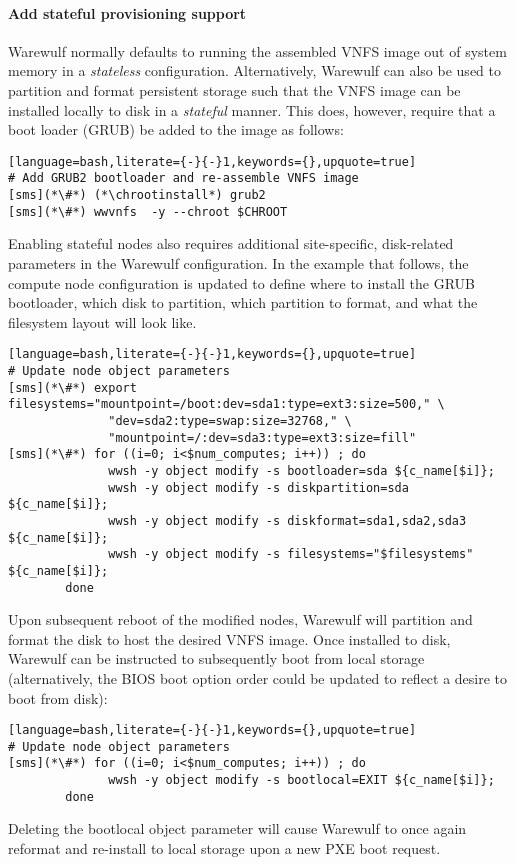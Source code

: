 \paragraph{Add stateful provisioning support}

Warewulf normally defaults to running the assembled VNFS image out of system
memory in a {\em stateless} configuration. Alternatively, Warewulf can also be
used to partition and format persistent storage such that the VNFS image can be
installed locally to disk in a {\em stateful} manner.  This does, however,
require that a boot loader (GRUB) be added to the image as follows:

\begin{lstlisting}[language=bash,literate={-}{-}1,keywords={},upquote=true]
# Add GRUB2 bootloader and re-assemble VNFS image
[sms](*\#*) (*\chrootinstall*) grub2
[sms](*\#*) wwvnfs  -y --chroot $CHROOT
\end{lstlisting}

\noindent Enabling stateful nodes also requires additional site-specific, disk-related
parameters in the Warewulf configuration. In the example that follows, the
compute node configuration is updated to define where to install the GRUB
bootloader, which disk to partition, which partition to format, and what the
filesystem layout will look like.

\begin{lstlisting}[language=bash,literate={-}{-}1,keywords={},upquote=true]
# Update node object parameters
[sms](*\#*) export filesystems="mountpoint=/boot:dev=sda1:type=ext3:size=500," \
              "dev=sda2:type=swap:size=32768," \
              "mountpoint=/:dev=sda3:type=ext3:size=fill"
[sms](*\#*) for ((i=0; i<$num_computes; i++)) ; do 
              wwsh -y object modify -s bootloader=sda ${c_name[$i]};
              wwsh -y object modify -s diskpartition=sda ${c_name[$i]};
              wwsh -y object modify -s diskformat=sda1,sda2,sda3 ${c_name[$i]};
              wwsh -y object modify -s filesystems="$filesystems" ${c_name[$i]};
        done
\end{lstlisting}

\noindent Upon subsequent reboot of the modified nodes, Warewulf will partition
and format the disk to host the desired VNFS image.  Once installed to disk,
Warewulf can be instructed to subsequently boot from local storage
(alternatively, the BIOS boot option order could be updated to reflect a desire
to boot from disk):

\begin{lstlisting}[language=bash,literate={-}{-}1,keywords={},upquote=true]
# Update node object parameters
[sms](*\#*) for ((i=0; i<$num_computes; i++)) ; do 
              wwsh -y object modify -s bootlocal=EXIT ${c_name[$i]};
        done
\end{lstlisting}


\noindent Deleting the bootlocal object parameter will cause Warewulf to once
again reformat and re-install to local storage upon a new PXE boot request.
